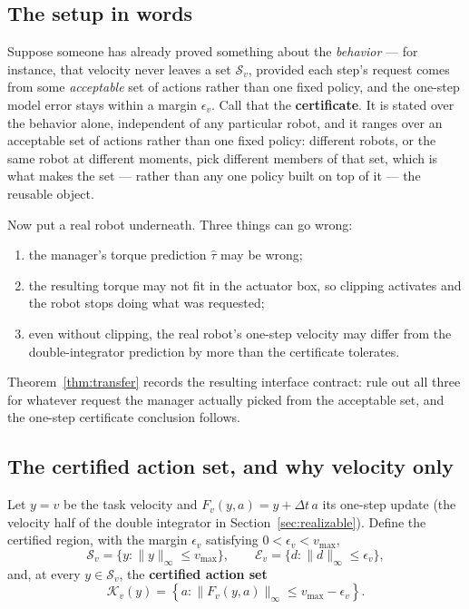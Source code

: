 \documentclass[journal]{IEEEtran}
\begin{document}
\subsection{The setup in words}

Suppose someone has already proved something about the \emph{behavior} --- for instance, that velocity never leaves a set $\mathcal S_v$, provided each step's request comes from some \emph{acceptable} set of actions rather than one fixed policy, and the one-step model error stays within a margin $\epsilon_v$. Call that the \textbf{certificate}. It is stated over the behavior alone, independent of any particular robot, and it ranges over an acceptable set of actions rather than one fixed policy: different robots, or the same robot at different moments, pick different members of that set, which is what makes the set --- rather than any one policy built on top of it --- the reusable object.

Now put a real robot underneath. Three things can go wrong:
\begin{enumerate}
\item the manager's torque prediction $\hat\tau$ may be wrong;
\item the resulting torque may not fit in the actuator box, so clipping activates and the robot stops doing what was requested;
\item even without clipping, the real robot's one-step velocity may differ from the double-integrator prediction by more than the certificate tolerates.
\end{enumerate}

Theorem~\ref{thm:transfer} records the resulting interface contract: rule out all three for whatever request the manager actually picked from the acceptable set, and the one-step certificate conclusion follows.

\subsection{The certified action set, and why velocity only}

Let $y=v$ be the task velocity and $F_v(y,a)=y+\Delta t\,a$ its one-step update (the velocity half of the double integrator in Section~\ref{sec:realizable}). Define the certified region, with the margin $\epsilon_v$ satisfying $0<\epsilon_v<v_{\max}$,
\[
\mathcal S_v=\{y:\|y\|_\infty\le v_{\max}\},
\qquad
\mathcal E_v=\{d:\|d\|_\infty\le\epsilon_v\},
\]
and, at every $y\in\mathcal S_v$, the \textbf{certified action set}
\[
\mathcal K_v(y)=\left\{a:\|F_v(y,a)\|_\infty\le v_{\max}-\epsilon_v\right\}.
\]
\end{document}
